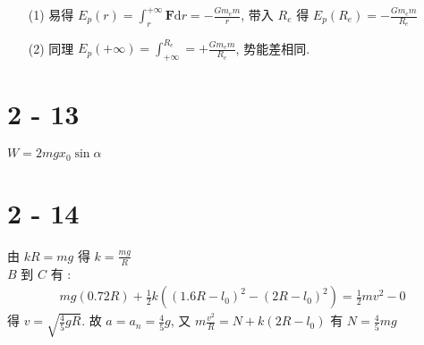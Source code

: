 \documentclass{article}
\newcommand{\dd}{\mathrm{d}}
\begin{document}
\begin{itemize}
    \item [(1)] 易得 $E_p(r) = \int_{r}^{+\infty}\boldsymbol{F}\dd r = -\frac{Gm_em}{r}$, 带入 $R_e$ 得 $E_p(R_e) = -\frac{Gm_em}{R_e}$
    \item [(2)] 同理 $E_p(+\infty) = \int_{+\infty}^{R_e} = + \frac{Gm_em}{R_e}$, 势能差相同.
\end{itemize}

\section*{2 - 13}

$W = 2mgx_0 \sin \alpha$

\section*{2 - 14}

由 $kR = mg$ 得 $k = \frac{mg}{R}$ \\
$B$ 到 $C$ 有 :
\begin{align*}
    mg(0.72R) + \frac{1}{2}k\left((1.6R - l_0)^2 - (2R - l_0)^2\right) = \frac{1}{2}mv^2 - 0
\end{align*}
得 $v = \sqrt{\frac{4}{5}gR}$. 故 $a = a_n = \frac{4}{5}g$, 又 $m\frac{v^2}{R} = N + k(2R - l_0)$ 有 $N = \frac{4}{5}mg$
\end{document}
